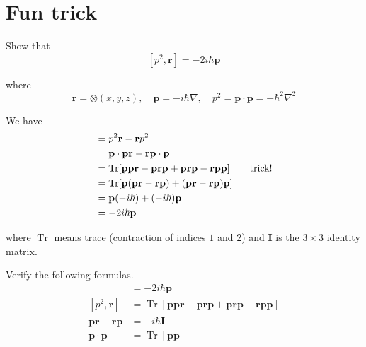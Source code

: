 

\section*{Fun trick}

Show that
\begin{equation*}
\left[p^2,\mathbf r\right]=-2i\hbar\mathbf p
\end{equation*}

where
\begin{equation*}
\mathbf r=\otimes(x,y,z),\quad
\mathbf p=-i\hbar\nabla,\quad
p^2=\mathbf p\cdot\mathbf p=-\hbar^2\nabla^2
\end{equation*}

We have
\begin{align*}
[p^2,\mathbf r]
&=p^2\mathbf r-\mathbf rp^2
\\
&=\mathbf p\cdot\mathbf p\mathbf r-\mathbf r \mathbf p\cdot\mathbf p
\\
&=\operatorname{Tr}[\mathbf p\mathbf p\mathbf r-\mathbf p\mathbf r\mathbf p
+\mathbf p\mathbf r\mathbf p-\mathbf r\mathbf p\mathbf p]
\tag*{\text{trick!}}
\\
&=\operatorname{Tr}[\mathbf p(\mathbf{pr}-\mathbf{rp})
+(\mathbf{pr}-\mathbf{rp})\mathbf p]
\\
&=\mathbf p(-i\hbar)+(-i\hbar)\mathbf p
\\
&=-2i\hbar\mathbf p
\end{align*}

where $\operatorname{Tr}$ means trace (contraction of indices $1$ and $2$) and
$\mathbf I$ is the $3\times3$ identity matrix.

\bigskip
Verify the following formulas.
\begin{align*}
[p^2,\mathbf r]
&=-2i\hbar\mathbf p
\tag{1}
\\[1ex]
[p^2,\mathbf r]
&=\operatorname{Tr}[\mathbf p\mathbf p\mathbf r-\mathbf p\mathbf r\mathbf p
+\mathbf p\mathbf r\mathbf p-\mathbf r\mathbf p\mathbf p]
\tag{2}
\\[1ex]
\mathbf p\mathbf r-\mathbf r\mathbf p&=-i\hbar\mathbf I
\tag{3}
\\[1ex]
\mathbf p\cdot\mathbf p&=\operatorname{Tr}[\mathbf p\mathbf p]
\tag{4}
\end{align*}


